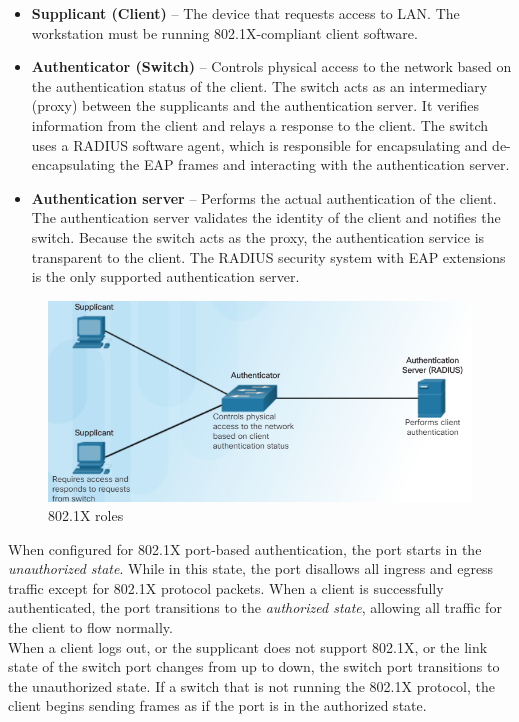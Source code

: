 \begin{itemize}
\item \textbf{Supplicant (Client)} -- The device that requests access to LAN. The workstation must be running 802.1X-compliant client software. 
\item \textbf{Authenticator (Switch)} -- Controls physical access to the network based on the authentication status of the client. The switch acts as an intermediary (proxy) between the supplicants and the authentication server. It verifies information from the client and relays a response to the client. The switch uses a RADIUS software agent, which is responsible for encapsulating and de-encapsulating the EAP frames and interacting with the authentication server.
\item \textbf{Authentication server} -- Performs the actual authentication of the client. The authentication server validates the identity of the client and notifies the switch. Because the switch acts as the proxy, the authentication service is transparent to the client. The RADIUS security system with EAP extensions is the only supported authentication server.
\end{itemize}

\begin{figure}[hbtp]
\caption{802.1X roles}\label{802.1X}
\centering
\includegraphics[scale=0.7]{pictures/8021X.PNG}
\end{figure}


When configured for 802.1X port-based authentication, the port starts in the \emph{unauthorized state}. While in this state, the port disallows all ingress and egress traffic except for 802.1X protocol packets. When a client is successfully authenticated, the port transitions to the \emph{authorized state}, allowing all traffic for the client to flow normally. \\

When a client logs out, or the supplicant does not support 802.1X, or the link state of the switch port changes from up to down, the switch port transitions to the unauthorized state. If a switch that is not running the 802.1X protocol, the client begins sending frames as if the port is in the authorized state.\\


